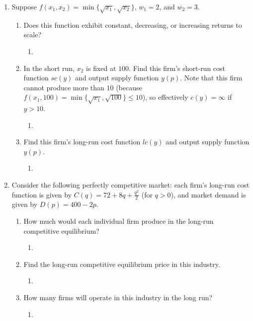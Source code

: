 \documentclass[11pt]{article}
\begin{document}
\begin{enumerate}
\item Suppose $f(x_{1},x_{2})=\min\{\sqrt{x_{1}},\sqrt{x_{2}}\}$, $w_{1}=2$, and $w_{2}=3$.
    \begin{enumerate}
        \item Does this function exhibit constant, decreasing, or increasing returns to scale?
        \begin{enumerate}
            \item 
        \end{enumerate}

        \item In the short run, $x_{2}$ is fixed at $100$. Find this firm's short-run cost function $sc(y)$ and output supply function $y(p)$. Note that this firm cannot produce more than $10$ (because $f(x_{1},100)=\min\{\sqrt{x_{1}},\sqrt{100}\}\leq 10$), so effectively $c(y)=\infty$ if $y>10$.
        \begin{enumerate}
            \item 
        \end{enumerate}

        \item Find this firm's long-run cost function $lc(y)$ and output supply function $y(p)$.
        \begin{enumerate}
            \item 
        \end{enumerate}

    \end{enumerate}

\item Consider the following perfectly competitive market: each firm's long-run cost function is given by $C(q)=72+8q+\frac{q^{2}}{2}$ (for $q>0$), and market demand is given by $D(p)=400-2p$.
    \begin{enumerate}
    \item How much would each individual firm produce in the long-run competitive equilibrium?
    \begin{enumerate}
        \item 
    \end{enumerate}

    \item Find the long-run competitive equilibrium price in this industry.
    \begin{enumerate}
        \item 
    \end{enumerate}

    \item How many firms will operate in this industry in the long run?
    \begin{enumerate}
        \item 
    \end{enumerate}

    \end{enumerate}

\end{enumerate}
\end{document}
